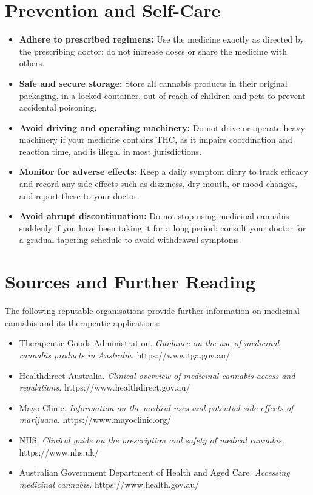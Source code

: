 \section*{Prevention and Self-Care}
\begin{itemize}
    \item \textbf{Adhere to prescribed regimens:} Use the medicine exactly as directed by the prescribing doctor; do not increase doses or share the medicine with others.
    \item \textbf{Safe and secure storage:} Store all cannabis products in their original packaging, in a locked container, out of reach of children and pets to prevent accidental poisoning.
    \item \textbf{Avoid driving and operating machinery:} Do not drive or operate heavy machinery if your medicine contains THC, as it impairs coordination and reaction time, and is illegal in most jurisdictions.
    \item \textbf{Monitor for adverse effects:} Keep a daily symptom diary to track efficacy and record any side effects such as dizziness, dry mouth, or mood changes, and report these to your doctor.
    \item \textbf{Avoid abrupt discontinuation:} Do not stop using medicinal cannabis suddenly if you have been taking it for a long period; consult your doctor for a gradual tapering schedule to avoid withdrawal symptoms.
\end{itemize}

\section*{Sources and Further Reading}
The following reputable organisations provide further information on medicinal cannabis and its therapeutic applications:
\begin{itemize}
    \item Therapeutic Goods Administration. \textit{Guidance on the use of medicinal cannabis products in Australia.} https://www.tga.gov.au/
    \item Healthdirect Australia. \textit{Clinical overview of medicinal cannabis access and regulations.} https://www.healthdirect.gov.au/
    \item Mayo Clinic. \textit{Information on the medical uses and potential side effects of marijuana.} https://www.mayoclinic.org/
    \item NHS. \textit{Clinical guide on the prescription and safety of medical cannabis.} https://www.nhs.uk/
    \item Australian Government Department of Health and Aged Care. \textit{Accessing medicinal cannabis.} https://www.health.gov.au/
\end{itemize}
